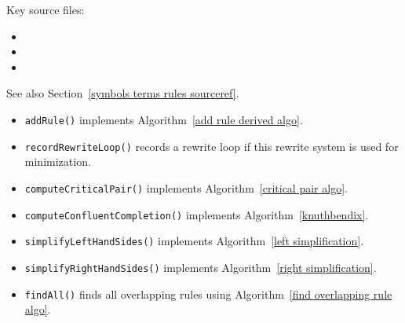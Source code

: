 \documentclass[../generics]{subfiles}
\begin{document}
Key source files:
\begin{itemize}
\item {}
\item {}
\item {}
\end{itemize}

See also Section~\ref{symbols terms rules sourceref}.
\begin{itemize}
\item \texttt{addRule()} implements Algorithm~\ref{add rule derived algo}.
\item \texttt{recordRewriteLoop()} records a rewrite loop if this rewrite system is used for minimization.
\item {}\texttt{computeCriticalPair()} implements Algorithm~\ref{critical pair algo}.
\item {}\texttt{computeConfluentCompletion()} implements Algorithm~\ref{knuthbendix}.
\item \texttt{simplifyLeftHandSides()} implements Algorithm~\ref{left simplification}.
\item \texttt{simplifyRightHandSides()} implements Algorithm~\ref{right simplification}.
\end{itemize}

\begin{itemize}
\item \texttt{findAll()} finds all overlapping rules using Algorithm~\ref{find overlapping rule algo}.
\end{itemize}
\end{document}
